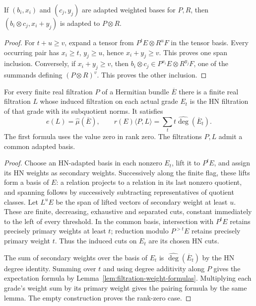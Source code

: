 \begin{lemma}
\label{lem:tensor-filtration-weights}
\leanok
If $(b_i,x_i)$ and $(c_j,y_j)$ are adapted weighted bases for $P,R$,
then $(b_i\otimes c_j,x_i+y_j)$ is adapted to $P\otimes R$.
\end{lemma}
\begin{proof}
For $t+u\ge v$, expand a tensor from $P^tE\otimes R^uF$ in the
tensor basis. Every occurring pair has $x_i\ge t$, $y_j\ge u$,
hence $x_i+y_j\ge v$. This proves one span inclusion.
Conversely, if $x_i+y_j\ge v$, then
$b_i\otimes c_j\in P^{x_i}E\otimes R^{y_j}F$, one of the summands
defining $(P\otimes R)^v$. This proves the other inclusion.
\end{proof}

\begin{lemma}
\label{lem:grade-hn-lift}
\leanok
For every finite real filtration $P$ of a Hermitian bundle $\overline E$
there is a finite real filtration $L$ whose induced filtration on
each actual grade $E_t$ is the HN filtration of that grade with its
subquotient norms. It satisfies
\[
 e(L)=\widehat\mu(\overline E),\qquad
 r(E)\langle P,L\rangle=\sum_t t\widehat{\deg}(\overline E_t).
\]
The first formula uses the value zero in rank zero. The filtrations
$P,L$ admit a common adapted basis.
\end{lemma}
\begin{proof}
Choose an HN-adapted basis in each nonzero $E_t$, lift it to $P^tE$,
and assign its HN weights as secondary weights. Successively along the
finite flag, these lifts form a basis of $E$: a relation projects to
a relation in its last nonzero quotient, and spanning follows by
successively subtracting representatives of quotient classes.
Let $L^uE$ be the span of lifted vectors of secondary weight at least
$u$. These are finite, decreasing, exhaustive and separated cuts,
constant immediately to the left of every threshold. In the common
basis, intersection with $P^tE$ retains precisely primary weights at
least $t$; reduction modulo $P^{>t}E$ retains precisely primary weight
$t$. Thus the induced cuts on $E_t$ are its chosen HN cuts.

The sum of secondary weights over the basis of $E_t$ is
$\widehat{\deg}(\overline E_t)$ by the HN degree identity.
Summing over $t$ and using degree additivity along $P$ gives the
expectation formula by Lemma~\ref{lem:filtration-weight-formulas}.
Multiplying each grade's weight sum by its primary weight gives the
pairing formula by the same lemma. The empty construction proves
the rank-zero case.
\end{proof}

